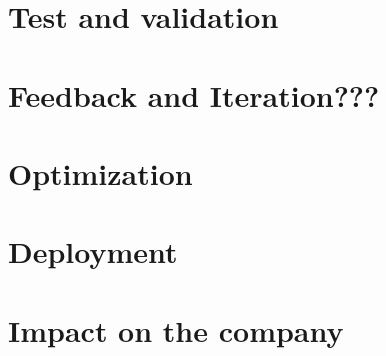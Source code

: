 \section{Test and validation}

\section{Feedback and Iteration???}

\section{Optimization}  

\section{Deployment}


\section{Impact on the company}
